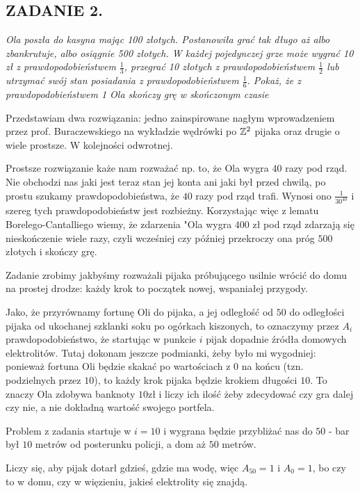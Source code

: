 \documentclass{article}
\begin{document}
\subsection*{ZADANIE 2.}
\emph{\color{pink}Ola poszła do kasyna mając 100 złotych. Postanowiła grać tak długo aż albo zbankrutuje, albo osiągnie 500 złotych. W każdej pojedynczej grze może wygrać 10 zł z prawdopodobieństwem $\frac13$, przegrać 10 złotych z prawdopodobieństwem $\frac12$ lub utrzymać swój stan posiadania z prawdopodobieństwem $\frac16$. Pokaż, że z prawdopodobieństwem 1 Ola skończy grę w skończonym czasie}
\smallskip

Przedstawiam dwa rozwiązania: jedno zainspirowane nagłym wprowadzeniem przez prof. Buraczewskiego na wykładzie wędrówki po $\mathbb{Z}^2$ pijaka oraz drugie o wiele prostsze. W kolejności odwrotnej.

Prostsze rozwiązanie każe nam rozważać np. to, że Ola wygra $40$ razy pod rząd. Nie obchodzi nas jaki jest teraz stan jej konta ani jaki był przed chwilą, po prostu szukamy prawdopodobieństwa, że $40$ razy pod rząd trafi. Wynosi ono $\frac1{30^40}$ i szereg tych prawdopodobieństw jest rozbieżny. Korzystając więc z lematu Borelego-Cantalliego wiemy, że zdarzenia "Ola wygra $400$ zł pod rząd zdarzają się nieskończenie wiele razy, czyli wcześniej czy później przekroczy ona próg $500$ złotych i skończy grę.
\medskip

\medskip

Zadanie zrobimy jakbyśmy rozważali pijaka próbującego usilnie wrócić do domu na prostej drodze: każdy krok to początek nowej, wspaniałej przygody.

Jako, że przyrównamy fortunę Oli do pijaka, a jej odległość od $50$ do odległości pijaka od ukochanej szklanki soku po ogórkach kiszonych, to oznaczymy przez $A_i$ prawdopodobieństwo, że startując w punkcie $i$ pijak dopadnie źródła domowych elektrolitów. 
Tutaj dokonam jeszcze podmianki, żeby było mi wygodniej: ponieważ fortuna Oli będzie skakać po wartościach z $0$ na końcu (tzn. podzielnych przez $10$), to każdy krok pijaka będzie krokiem długości $10$. 
To znaczy Ola zdobywa banknoty $10$zł i liczy ich ilość żeby zdecydować czy gra dalej czy nie, a nie dokładną wartość swojego portfela.

Problem z zadania startuje w $i=10$ i wygrana będzie przybliżać nas do $50$ - bar był $10$ metrów od posterunku policji, a dom aż $50$ metrów. 

Liczy się, aby pijak dotarł gdzieś, gdzie ma wodę, więc $A_{50}=1$ i $A_0=1$, bo czy to w domu, czy w więzieniu, jakieś elektrolity się znajdą.
\medskip
\end{document}
